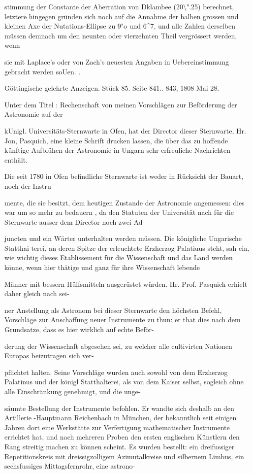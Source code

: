\documentclass[10pt,a4paper]{article}
\begin{document}
stimmung der Constante der Aberration von Dklambee (20\textbackslash{}".25) berechnet, letztere hingegen gründen sich noch auf die Annahme der halben grossen und kleinen Axe der Nutations-Ellipse zu 9"o und 6\textasciicircum{}7, und alle Zahlen derselben müssen demnach um den neunten oder vierzehnten Theil vergrössert werden, wenn

sie mit Laplace's oder von Zach's neuesten Angaben in Uebereinstimmung gebracht werden soUen. .

Göttingische gelehrte Anzeigen. Stück 85. Seite 841.. 843, 1808 Mai 28.

Unter dem Titel : Rechenschaft von meinen Vorschlägen zur Beförderung der Astronomie auf der

kUnigl. Universitäts-Sternwarte in Ofen, hat der Director dieser Sternwarte, Hr. Jon, Pasquich, eine kleine Schrift drucken lassen, die über das zu hoffende künftige Aufblühen der Astronomie in Ungarn sehr erfreuliche Nachrichten enthält.

Die seit 1780 in Ofen befindliche Sternwarte ist weder in Rücksicht der Bauart, noch der Instru-

mente, die sie besitzt, dem heutigen Zustande der Astronomie angemessen: dies war um so mehr zu bedauern , da den Statuten der Universität nach für die Sternwarte ausser dem Director noch zwei Ad-

juncten und ein Wärter unterhalten werden müssen. Die königliche Ungarische Statthai terei, an deren Spitze der erleuchtete Erzherzog Palatiuus steht, sah ein, wie wichtig dieses Etablissement für die Wissenschaft und das Land werden könne, wenn hier thätige und ganz für ihre Wissenschaft lebende

Männer mit bessern Hülfsmitteln ausgerüstet würden. Hr. Prof. Pasquich erhielt daher gleich nach sei-

ner Anstellung als Astronom bei dieser Sternwarte den höchsten Befehl, Vorschläge zur Anschaffung neuer Instrumente zu thun: er that dies nach dem Grundsatze, dass es hier wirklich auf echte Beför-

derung der Wissenschaft abgesehen sei, zu welcher alle cultivirten Nationen Europas beizutragen sich ver-

pflichtet halten. Seine Vorschläge wurden auch sowohl von dem Erzherzog Palatinus und der königl Statthalterei, als von dem Kaiser selbst, sogleich ohne alle Einschränkung genehmigt, und die unge-

säumte Bestellung der Instrumente befohlen. Er wandte sich deshalb an den Artillerie -Hauptmann Reichenbach in München, der bekanntlich seit einigen Jahren dort eine Werkstätte zur Verfertigung mathematischer Instrumente errichtet hat, und nach mehreren Proben den ersten englischen Künstlern den Rang streitig machen zu können scheint. Es wurden bestellt: ein dreifussiger Repetitionskreis mit dreissigzolligem Azimutalkreise und silbernem Limbus, ein sechsfussiges Mittagsfernrohr, eine astrono-
\end{document}
